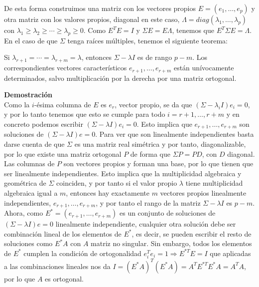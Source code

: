 De esta forma construimos una matriz con los vectores propios $E = (e_1, \dots, e_p)$ y otra matriz con los valores propios, diagonal en este caso, $\Lambda = diag(\lambda_1, \dots, \lambda_p)$ con $\lambda_1 \geq \lambda_2 \geq \cdots \geq \lambda_p \geq 0$. Como $E^T E = I$ y $\Sigma E = E \Lambda$, tenemos que $E^T \Sigma E = \Lambda$.\\

En el caso de que $\Sigma$ tenga raíces múltiples, tenemos el siguiente teorema:

\begin{teorema}
Si $\lambda_{r+1} = \cdots = \lambda_{r+m} = \lambda$, entonces $\Sigma - \lambda I$ es de rango $p-m$. Los correspondientes vectores característicos $e_{r+1}, \dots, e_{r+m}$ están unívocamente determinados, salvo multiplicación por la derecha por una matriz ortogonal.
\end{teorema}

\textbf{Demostración}\\

Como la $i$-ésima columna de $E$ es $e_r$, vector propio, se da que $(\Sigma - \lambda_i I)e_i = 0$, y por lo tanto tenemos que esto se cumple para todo $i = r+1, \dots, r+m$ y en concreto podemos escribir $(\Sigma - \lambda I)e_i = 0$. Esto implica que $e_{r+1}, \dots, e_{r+m}$ son soluciones de $(\Sigma - \lambda I)e = 0$. Para ver que son linealmente independientes basta darse cuenta de que $\Sigma$ es una matriz real simétrica y por tanto, diagonalizable, por lo que existe una matriz ortogonal $P$ de forma que $\Sigma P = PD$, con $D$ diagonal. Las columnas de $P$ son vectores propios y forman una base, por lo que tienen que ser linealmente independientes. Esto implica que la multiplicidad algebraica y geométrica de $\Sigma$ coinciden, y por tanto si el valor propio $\lambda$ tiene multiplicidad algebraica igual a $m$, entonces hay exactamente $m$ vectores propios linealmente independientes, $e_{r+1}, \dots, e_{r+m}$, y por tanto el rango de la matriz $\Sigma - \lambda I$ es $p-m$.\\ %

Ahora, como $E^* = (e_{r+1},\dots, e_{r+m})$ es un conjunto de soluciones de $(\Sigma - \lambda I) e = 0$ linealmente independiente, cualquier otra solución debe ser combinación lineal de los elementos de $E^*$, es decir, se pueden escribir el resto de soluciones como $E^*A$ con $A$ matriz no singular. Sin embargo, todos los elementos de $E^*$ cumplen la condición de ortogonalidad $e_i^T e_i = 1 \Rightarrow E^{*T} E = I$ que aplicadas a las combinaciones lineales nos da $I = (E^*A)^T (E^*A) = A^TE^{*T}E^*A = A^TA$, por lo que $A$ es ortogonal.


